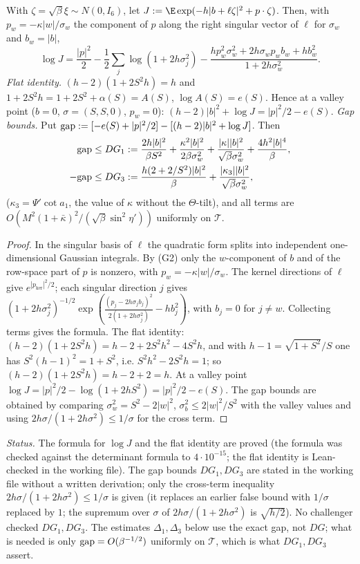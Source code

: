 \begin{lemma}\label{tu:L-gauss}
With $\zeta=\sqrt\beta\xi\sim N(0,I_6)$, let $J:=\E\exp(-h|b+\ell\zeta|^2+p\cdot\zeta)$. Then, with
$p_w=-\kappa|w|/\sigma_w$ the component of $p$ along the right singular vector of $\ell$ for $\sigma_w$ and
$b_w=|b|$,
\[
\log J=\frac{|p|^2}2-\frac12\sum_j\log(1+2h\sigma_j^2)-\frac{hp_w^2\sigma_w^2+2h\sigma_wp_wb_w+hb_w^2}{1+2h\sigma_w^2}.
\]
\emph{Flat identity.} $(h-2)(1+2S^2h)=h$ and $1+2S^2h=1+2S^2+\alpha(S)=A(S)$, $\log A(S)=e(S)$. Hence at a
valley point ($b=0$, $\sigma=(S,S,0)$, $p_w=0$): $(h-2)|b|^2+\log J=|p|^2/2-e(S)$.
\emph{Gap bounds.} Put ${\rm gap}:=[-e(S)+|p|^2/2]-[(h-2)|b|^2+\log J]$. Then
\begin{align*}
{\rm gap}&\le DG_1:=\frac{2h|b|^2}{\beta S^2}+\frac{\kappa^2|b|^2}{2\beta\sigma_w^2}+\frac{|\kappa||b|^2}{\sqrt\beta\sigma_w^2}+\frac{4h^2|b|^4}\beta,\\
-{\rm gap}&\le DG_3:=\frac{h(2+2/S^2)|b|^2}\beta+\frac{|\kappa_3||b|^2}{\sqrt\beta\sigma_w^2},
\end{align*}
($\kappa_3=\Psi'\cot a_1$, the value of $\kappa$ without the $\Theta$-tilt), and all terms are
$O(M^2(1+\bar\kappa)^2/(\sqrt\beta\sin^2\eta'))$ uniformly on $\mathcal T$.
\end{lemma}

\begin{proof}
In the singular basis of $\ell$ the quadratic form splits into independent one-dimensional Gaussian
integrals. By (G2) only the $\hat w$-component of $b$ and of the row-space part of $p$ is nonzero, with
$p_w=-\kappa|w|/\sigma_w$. The kernel directions of $\ell$ give $e^{|p_{\ker}|^2/2}$; each singular direction
$j$ gives $(1+2h\sigma_j^2)^{-1/2}\exp(\frac{(p_j-2h\sigma_jb_j)^2}{2(1+2h\sigma_j^2)}-hb_j^2)$, with $b_j=0$ for $j\ne w$.
Collecting terms gives the formula. The flat identity:
$(h-2)(1+2S^2h)=h-2+2S^2h^2-4S^2h$, and with $h-1=\sqrt{1+S^2}/S$ one has $S^2(h-1)^2=1+S^2$, i.e.
$S^2h^2-2S^2h=1$; so $(h-2)(1+2S^2h)=h-2+2=h$. At a valley point $\log J=|p|^2/2-\log(1+2hS^2)=|p|^2/2-e(S)$.
The gap bounds are obtained by comparing $\sigma_w^2=S^2-2|w|^2$, $\sigma_b^2\le2|w|^2/S^2$ with the
valley values and using $2h\sigma/(1+2h\sigma^2)\le1/\sigma$ for the cross term.
\end{proof}

\noindent\emph{Status.} The formula for $\log J$ and the flat identity are proved (the formula was checked against the
determinant formula to $4\cdot10^{-15}$; the flat identity is Lean-checked in the working file). The gap bounds
$DG_1,DG_3$ are stated in the working file without a written derivation; only the cross-term inequality
$2h\sigma/(1+2h\sigma^2)\le1/\sigma$ is given (it replaces an earlier false bound with $1/\sigma$ replaced by $1$;
the supremum over $\sigma$ of $2h\sigma/(1+2h\sigma^2)$ is $\sqrt{h/2}$). No challenger checked $DG_1,DG_3$. The
estimates $\Delta_1,\Delta_3$ below use the exact gap, not $DG$; what is needed is only ${\rm gap}=O(\beta^{-1/2})$
uniformly on $\mathcal T$, which is what $DG_1,DG_3$ assert.


